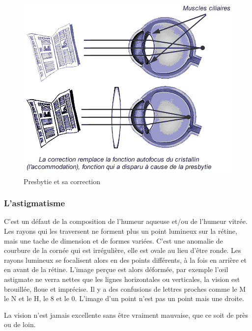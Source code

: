 \documentclass[a4paper, 12pt, onecolumn, openany]{report}
\begin{document}
	\begin{figure}[h]
	\begin{center}
	\includegraphics[scale=0.7]{presbytie.png}
	\end{center}
	\caption{Presbytie et sa correction}
	\label{Presbytie et sa correction}
	\end{figure}
	
	\subsubsection{L'astigmatisme}
	C’est un défaut de la composition de l’humeur aqueuse et/ou de l’humeur vitrée. Les rayons qui les traversent ne forment plus un point lumineux sur la rétine, mais une tache de dimension et de formes variées. C’est une anomalie de courbure de la cornée qui est irrégulière, elle est ovale au lieu d’être ronde. Les rayons lumineux se focalisent alors en des points différents, à la fois en arrière et en avant de la rétine. L’image perçue est alors déformée, par exemple l’œil astigmate ne verra nettes que les lignes horizontales ou verticales, la vision est brouillée, floue et imprécise. Il y a des confusions de lettres proches comme le M le N et le H, le 8 et le 0. L’image d’un point n’est pas un point mais une droite. 
	
	La vision n’est jamais excellente sans être vraiment mauvaise, que ce soit de près ou de loin. 
	
\end{document}
